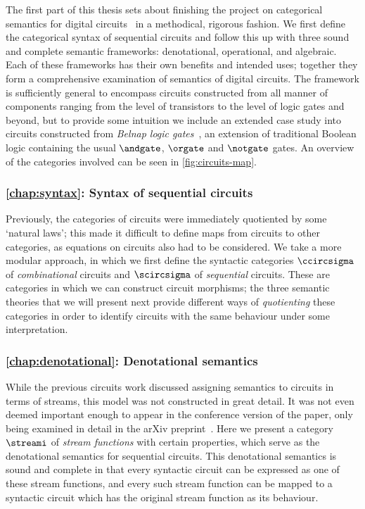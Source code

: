 The first part of this thesis sets about finishing the project on categorical
semantics for digital
circuits~\cite{ghica2016categorical,ghica2017diagrammatic} in a methodical,
rigorous fashion.
We first define the categorical syntax of sequential circuits and follow this up
with three sound and complete semantic frameworks: denotational, operational,
and algebraic.
Each of these frameworks has their own benefits and intended uses; together they
form a comprehensive examination of semantics of digital circuits.
The framework is sufficiently general to encompass circuits constructed from
all manner of components ranging from the level of transistors to the level of
logic gates and beyond, but to provide some intuition we
include an extended case study into circuits constructed from
\emph{Belnap logic gates}~\cite{belnap1977useful}, an extension of traditional
Boolean logic containing the usual \(\andgate\), \(\orgate\) and \(\notgate\)
gates.
An overview of the categories involved can be seen in \cref{fig:circuits-map}.

\subsubsection{\cref{chap:syntax}: Syntax of sequential circuits}

Previously, the categories of circuits were immediately quotiented by some
`natural laws'; this made it difficult to define maps from circuits to other
categories, as equations on circuits also had to be considered.
We take a more modular approach, in which we first define the syntactic
categories \(\ccircsigma\) of \emph{combinational} circuits and \(\scircsigma\)
of \emph{sequential} circuits.
These are categories in which we can construct circuit morphisms; the three
semantic theories that we will present next provide different ways of
\emph{quotienting} these categories in order to identify circuits with the same
behaviour under some interpretation.

\subsubsection{\cref{chap:denotational}: Denotational semantics}

While the previous circuits work discussed assigning semantics to circuits in
terms of streams, this model was not constructed in great detail.
It was not even deemed important enough to appear in the conference version of
the paper, only being examined in detail in the arXiv
preprint~\cite{ghica2017diagrammatica}.
Here we present a category \(\streami\) of \emph{stream functions} with certain
properties, which serve as the denotational semantics for sequential circuits.
This denotational semantics is sound and complete in that every syntactic
circuit can be expressed as one of these stream functions, and every such stream
function can be mapped to a syntactic circuit which has the original stream
function as its behaviour.

